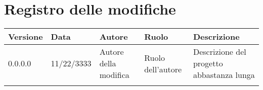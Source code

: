 \section*{\hfil Registro delle modifiche \hfil}
{
	\renewcommand{\arraystretch}{1.5}
	\centering
	\setlength{\aboverulesep}{0pt}
	\setlength{\belowrulesep}{0pt}
	\begin{longtable}{C{1.75cm} C{1.78cm} C{3.5cm} C{2.5cm} C{3.75cm}}
		\toprule 
		\textbf{Versione} & \textbf{Data} & \textbf{Autore} & \textbf{Ruolo} & \textbf{Descrizione}\\
		\toprule
		\endhead
		
		0.0.0.0 & 11/22/3333 & Autore della modifica & Ruolo dell'autore & Descrizione del progetto abbastanza lunga\\
			
		\bottomrule
		\hiderowcolors
	\end{longtable}
}
